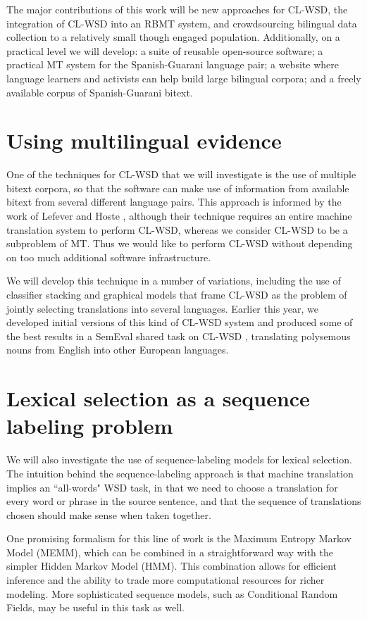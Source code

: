 \documentclass{article}
\begin{document}
The major contributions of this work will be new approaches for CL-WSD, the
integration of CL-WSD into an RBMT system, and crowdsourcing bilingual data
collection to a relatively small though engaged population.
Additionally, on a practical level we will develop: a suite of reusable
open-source software; a practical MT system for the Spanish-Guarani language
pair; a website where language learners and activists can help build large
bilingual corpora; and a freely available corpus of Spanish-Guarani bitext.

\section{Using multilingual evidence}
One of the techniques for CL-WSD that we will investigate is the use of
multiple bitext corpora, so that the software can make use of information from
available bitext from several different language pairs. This approach is
informed by the work of Lefever and Hoste
\cite{lefever-hoste-decock:2011:ACL-HLT2011}, although their technique requires
an entire machine translation system to perform CL-WSD, whereas we consider
CL-WSD to be a subproblem of MT. Thus we would like to perform CL-WSD without
depending on too much additional software infrastructure.

We will develop this technique in a number of variations, including the use of
classifier stacking and graphical models that frame CL-WSD as the problem
of jointly selecting translations into several languages. Earlier this year,
we developed initial versions of this kind of CL-WSD system
\cite{rudnick-liu-gasser:2013:SemEval-2013} and produced some of the best
results in a SemEval shared task on CL-WSD \cite{task10},
translating polysemous nouns from English into other European languages.

\section{Lexical selection as a sequence labeling problem}
We will also investigate the use of sequence-labeling models for
lexical selection.  The intuition behind the sequence-labeling approach is that
machine translation implies an ``all-words" WSD task, in that we need to choose
a translation for every word or phrase in the source sentence, and that the
sequence of translations chosen should make sense when taken together.

One promising formalism for this line of work is the Maximum
Entropy Markov Model (MEMM), which can be combined in a straightforward way
with the simpler Hidden Markov Model (HMM). This combination allows for
efficient inference and the ability to trade more computational resources for
richer modeling. More sophisticated sequence models, such as Conditional Random
Fields, may be useful in this task as well.
\end{document}
